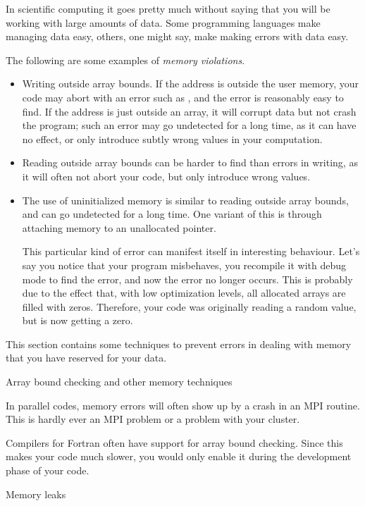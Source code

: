 In scientific computing it goes pretty much without saying that you
will be working with large amounts of data.
Some programming languages make managing data easy, others, one might
say, make making errors with data easy. 

The following are some examples of \emph{memory violations}.
\begin{itemize}
\item Writing outside array bounds. If the address is outside the user
  memory, your code may abort with an error such as
  , and the error is reasonably easy
  to find. If the address is just outside an array, it will corrupt
  data but not crash the program; such an error may go undetected for
  a long time, as it can have no effect, or only introduce subtly
  wrong values in your computation.
\item Reading outside array bounds can be harder to find than errors
  in writing, as it will often not abort your code, but only introduce
  wrong values.
\item The use of uninitialized memory is similar to reading outside
  array bounds, and can go undetected for a long time. One variant of
  this is through attaching memory to an unallocated pointer.

  This particular kind of error can manifest itself in interesting
  behaviour. Let's say you notice that your program misbehaves, you
  recompile it with debug mode to find the error, and now the error no
  longer occurs. This is probably due to the effect that, with low
  optimization levels, all allocated arrays are filled with
  zeros. Therefore, your code was originally reading a random value,
  but is now getting a zero.
\end{itemize}

This section contains some
techniques to prevent errors in dealing with memory that you have
reserved for your data.

 {Array bound checking and other memory techniques}

In parallel codes, memory errors will often show up by a crash in an
MPI routine. This is hardly ever an MPI problem or a problem with your
cluster.

Compilers for  Fortran often have support for array bound
checking. Since this makes your code much slower, you would only
enable it during the development phase of your code.

 {Memory leaks}

